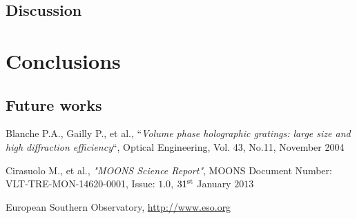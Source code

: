\documentclass[english, Lau, oneside]{sapthesis}%
\begin{document}
\section{Discussion}
\label{sec:moons}
 

\chapter{Conclusions}

\section{Future works}

\backmatter
{}
\begin{thebibliography}{17}

Blanche P.A., Gailly P., et al., “\textit{Volume phase holographic gratings: large size and high diffraction efficiency}“, Optical Engineering, Vol. 43, No.11, November 2004

Cirasuolo M., et al., \textit{"MOONS Science Report"}, MOONS Document Number: VLT-TRE-MON-14620-0001, Issue: $1.0$, $31^{\textup{st}}$ January $2013$

European Southern Observatory, \url{http://www.eso.org}

\end{thebibliography}
\end{document}
